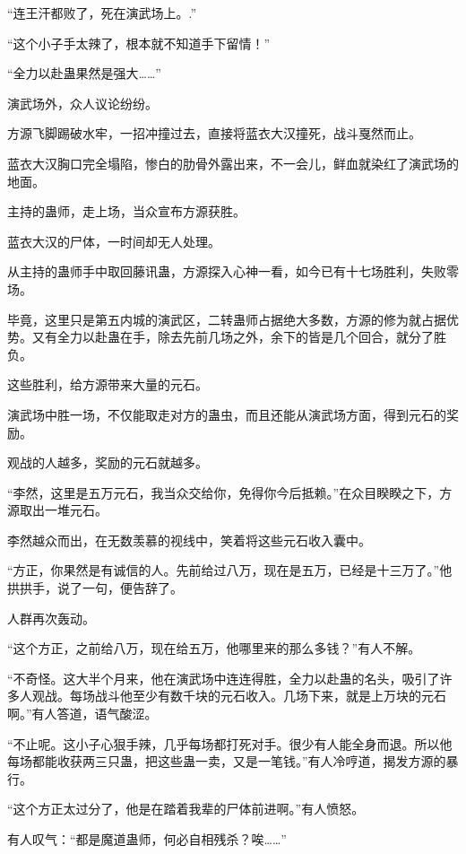 
\begin{this_body}

“连王汗都败了，死在演武场上。.”

“这个小子手太辣了，根本就不知道手下留情！”

“全力以赴蛊果然是强大……”

演武场外，众人议论纷纷。

方源飞脚踢破水牢，一招冲撞过去，直接将蓝衣大汉撞死，战斗戛然而止。

蓝衣大汉胸口完全塌陷，惨白的肋骨外露出来，不一会儿，鲜血就染红了演武场的地面。

主持的蛊师，走上场，当众宣布方源获胜。

蓝衣大汉的尸体，一时间却无人处理。

从主持的蛊师手中取回藤讯蛊，方源探入心神一看，如今已有十七场胜利，失败零场。

毕竟，这里只是第五内城的演武区，二转蛊师占据绝大多数，方源的修为就占据优势。又有全力以赴蛊在手，除去先前几场之外，余下的皆是几个回合，就分了胜负。

这些胜利，给方源带来大量的元石。

演武场中胜一场，不仅能取走对方的蛊虫，而且还能从演武场方面，得到元石的奖励。

观战的人越多，奖励的元石就越多。

“李然，这里是五万元石，我当众交给你，免得你今后抵赖。”在众目睽睽之下，方源取出一堆元石。

李然越众而出，在无数羡慕的视线中，笑着将这些元石收入囊中。

“方正，你果然是有诚信的人。先前给过八万，现在是五万，已经是十三万了。”他拱拱手，说了一句，便告辞了。

人群再次轰动。

“这个方正，之前给八万，现在给五万，他哪里来的那么多钱？”有人不解。

“不奇怪。这大半个月来，他在演武场中连连得胜，全力以赴蛊的名头，吸引了许多人观战。每场战斗他至少有数千块的元石收入。几场下来，就是上万块的元石啊。”有人答道，语气酸涩。

“不止呢。这小子心狠手辣，几乎每场都打死对手。很少有人能全身而退。所以他每场都能收获两三只蛊，把这些蛊一卖，又是一笔钱。”有人冷哼道，揭发方源的暴行。

“这个方正太过分了，他是在踏着我辈的尸体前进啊。”有人愤怒。

有人叹气：“都是魔道蛊师，何必自相残杀？唉……”


\end{this_body}
